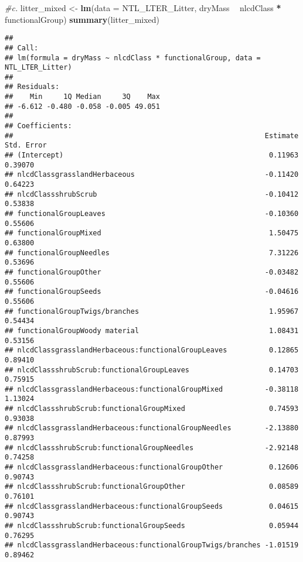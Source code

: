 \documentclass[]{article}
\newenvironment{Shaded}{\begin{snugshade}}{\end{snugshade}}
\newcommand{\CommentTok}[1]{\textcolor[rgb]{0.56,0.35,0.01}{\textit{#1}}}
\newcommand{\DataTypeTok}[1]{\textcolor[rgb]{0.13,0.29,0.53}{#1}}
\newcommand{\KeywordTok}[1]{\textcolor[rgb]{0.13,0.29,0.53}{\textbf{#1}}}
\newcommand{\NormalTok}[1]{#1}
\newcommand{\OperatorTok}[1]{\textcolor[rgb]{0.81,0.36,0.00}{\textbf{#1}}}
\newcommand{\StringTok}[1]{\textcolor[rgb]{0.31,0.60,0.02}{#1}}
\begin{document}
\begin{Shaded}
\begin{Highlighting}[]
\CommentTok{#c.}
\NormalTok{litter_mixed <-}\StringTok{ }\KeywordTok{lm}\NormalTok{(}\DataTypeTok{data =}\NormalTok{ NTL_LTER_Litter, dryMass }\OperatorTok{~}\StringTok{ }\NormalTok{nlcdClass }\OperatorTok{*}\StringTok{ }\NormalTok{functionalGroup)}
\KeywordTok{summary}\NormalTok{(litter_mixed)}
\end{Highlighting}
\end{Shaded}

\begin{verbatim}
## 
## Call:
## lm(formula = dryMass ~ nlcdClass * functionalGroup, data = NTL_LTER_Litter)
## 
## Residuals:
##    Min     1Q Median     3Q    Max 
## -6.612 -0.480 -0.058 -0.005 49.051 
## 
## Coefficients:
##                                                            Estimate Std. Error
## (Intercept)                                                 0.11963    0.39070
## nlcdClassgrasslandHerbaceous                               -0.11420    0.64223
## nlcdClassshrubScrub                                        -0.10412    0.53838
## functionalGroupLeaves                                      -0.10360    0.55606
## functionalGroupMixed                                        1.50475    0.63800
## functionalGroupNeedles                                      7.31226    0.53696
## functionalGroupOther                                       -0.03482    0.55606
## functionalGroupSeeds                                       -0.04616    0.55606
## functionalGroupTwigs/branches                               1.95967    0.54434
## functionalGroupWoody material                               1.08431    0.53156
## nlcdClassgrasslandHerbaceous:functionalGroupLeaves          0.12865    0.89410
## nlcdClassshrubScrub:functionalGroupLeaves                   0.14703    0.75915
## nlcdClassgrasslandHerbaceous:functionalGroupMixed          -0.38118    1.13024
## nlcdClassshrubScrub:functionalGroupMixed                    0.74593    0.93038
## nlcdClassgrasslandHerbaceous:functionalGroupNeedles        -2.13880    0.87993
## nlcdClassshrubScrub:functionalGroupNeedles                 -2.92148    0.74258
## nlcdClassgrasslandHerbaceous:functionalGroupOther           0.12606    0.90743
## nlcdClassshrubScrub:functionalGroupOther                    0.08589    0.76101
## nlcdClassgrasslandHerbaceous:functionalGroupSeeds           0.04615    0.90743
## nlcdClassshrubScrub:functionalGroupSeeds                    0.05944    0.76295
## nlcdClassgrasslandHerbaceous:functionalGroupTwigs/branches -1.01519    0.89462

\end{verbatim}
\end{document}
